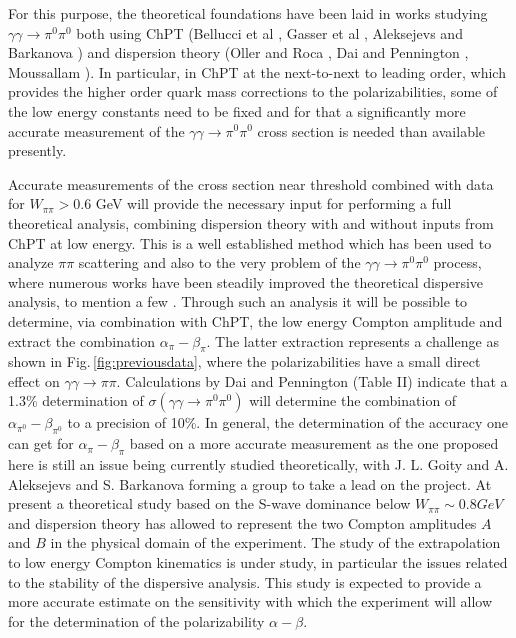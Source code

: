 For
this purpose, the theoretical foundations have been laid in works
studying $\gamma\gamma\to \pi^0\pi^0$ both using ChPT (Bellucci et al
\cite{Bellucci:1994hx,Bellucci:1994eb}, Gasser et al
\cite{Gasser:2005ud}, Aleksejevs and Barkanova
\cite{Aleksejevs:2014eea}) and dispersion theory (Oller and Roca
\cite{Oller:2008kf}, Dai and Pennington
\cite{Dai:2014zta,Dai:2014lza}, Moussallam
\cite{Moussallam:2013una}). In particular, in ChPT at the next-to-next
to leading order, which provides the higher order quark mass
corrections to the polarizabilities, some of the low energy constants
need to be fixed and for that a significantly more accurate
measurement of the $\gamma\gamma\to \pi^0\pi^0$ cross section is
needed than available presently.

Accurate measurements of the cross section near threshold combined
with data for $W_{\pi\pi}>0.6$ GeV will provide the necessary input
for performing a full theoretical analysis, combining dispersion
theory with and without inputs from ChPT at low energy. This is a well
established method which has been used to analyze $\pi\pi$
scattering and also to the very problem of the $\gamma\gamma \to \pi^0\pi^0$
process, where numerous works have been steadily improved the theoretical
dispersive analysis, to mention a
few \cite{Donoghue:1993kw,Oller:2007sh,Oller:2008kf,Moussallam:2013una,Dai:2016ytz}.
Through such an analysis it will be possible to determine,
via combination with ChPT, the low energy Compton amplitude and
extract the   combination $\alpha_\pi-\beta_\pi$. The
latter extraction represents a challenge as shown in
Fig.\,\ref{fig:previousdata}, where the polarizabilities have a small
direct effect on $\gamma\gamma\to \pi\pi$.  Calculations by Dai and
Pennington (Table II) \cite{Dai:2016ytz} indicate that a 1.3\%
determination of $\sigma(\gamma\gamma\rightarrow\pi^0\pi^0)$ will
determine the combination of $\alpha_{\pi^0}-\beta_{\pi^0}$ to a
precision of 10\%. 
In general, the
determination of the accuracy one can get for $\alpha_\pi-\beta_\pi$
based on a more accurate measurement as the one proposed here is still
an issue being currently studied theoretically, with J. L.  Goity and
A. Aleksejevs and S. Barkanova forming a group to take a lead on the project. 
At present a theoretical study based on the S-wave dominance below
$W_{\pi\pi}\sim 0.8 GeV$ and dispersion theory has allowed to represent the two
Compton amplitudes $A$ and $B$ in the physical domain of the experiment. The
study of the extrapolation to low energy Compton kinematics is under study, in
particular the issues related to the stability of the dispersive analysis. This
study is expected to provide a more accurate estimate on the sensitivity with
which the experiment will allow for the determination of the polarizability
$\alpha-\beta$.


